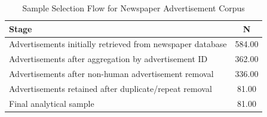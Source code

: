 \begin{table}[ht]
\centering
\begin{tabular}{p{12cm}c}
  \hline
Stage & N \\ 
  \hline
Advertisements initially retrieved from newspaper database & 584.00 \\ 
  Advertisements after aggregation by advertisement ID & 362.00 \\ 
  Advertisements after non-human advertisement removal & 336.00 \\ 
  Advertisements retained after duplicate/repeat removal & 81.00 \\ 
  Final analytical sample & 81.00 \\ 
   \hline
\end{tabular}
\caption{Sample Selection Flow for Newspaper Advertisement Corpus} 
\end{table}
